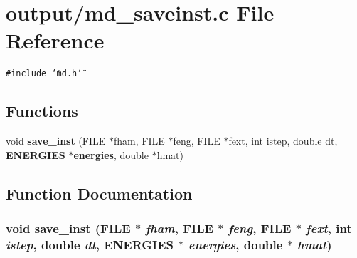 \section{output/md\_\-saveinst.c File Reference}
\label{md__saveinst_8c}
{\tt \#include \char`\"{}md.h\char`\"{}}\par
\subsection*{Functions}
\begin{CompactItemize}
\item 
void {\bf save\_\-inst} (FILE $\ast$fham, FILE $\ast$feng, FILE $\ast$fext, int istep, double dt, {\bf ENERGIES} $\ast${\bf energies}, double $\ast$hmat)
\end{CompactItemize}


\subsection{Function Documentation}
\subsubsection{\setlength{\rightskip}{0pt plus 5cm}void save\_\-inst (FILE $\ast$ {\em fham}, FILE $\ast$ {\em feng}, FILE $\ast$ {\em fext}, int {\em istep}, double {\em dt}, {\bf ENERGIES} $\ast$ {\em energies}, double $\ast$ {\em hmat})}\label{md__saveinst_8c_2ce668f14c74a0937f915fee9c9eedfe}


